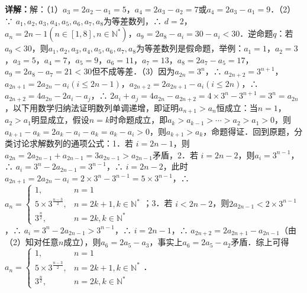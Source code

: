 \begin{question}[points=18]
\begin{solution}
\textbf{详解：}解：（1）$a_3=2a_2-a_1=5$，$a_4=2a_3-a_2=7$或$a_4=2a_3-a_1=9$．（2）∵ $a_1,a_2,a_3,a_4,a_5,a_6,a_7,a_8$为等差数列，∴ $d=2$，$a_n=2n-1(n\in[1,8],n\in\mathbb{N}^*)$，$a_9=2a_8-a_i=30-a_i<30$．逆命题$q$：若$a_9<30$，则$a_1,a_2,a_3,a_4,a_5,a_6,a_7,a_8$为等差数列是假命题，举例：$a_1=1$，$a_2=3$，$a_3=5$，$a_4=7$，$a_5=9$，$a_6=11$，$a_7=13$，$a_8=2a_7-a_5=17$，$a_9=2a_8-a_7=21<30$但不成等差．（3）因为$a_{2n}=3^n$，∴ $a_{2n+2}=3^{n+1}$，$a_{2n+1}=2a_{2n}-a_i(i\leq 2n-1)$，$a_{2n+2}=2a_{2n+1}-a_i(i\leq 2n)$，∴ $a_{2n+2}=4a_{2n}-2a_i-a_j$，∴ $2a_i+a_j=4a_{2n}-a_{2n+2}=4\times3^n-3^{n+1}=3^n=a_{2n}$，以下用数学归纳法证明数列单调递增，即证明$a_{n+1}>a_n$恒成立：当$n=1$，$a_2>a_1$明显成立，假设$n=k$时命题成立，即$a_k>a_{k-1}>\cdots>a_2>a_1>0$，则$a_{k+1}-a_k=2a_k-a_i-a_k=a_k-a_i>0$，则$a_{k+1}>a_k$，命题得证．回到原题，分类讨论求解数列的通项公式：1．若 $i=2n-1$，则$a_{2n}=2a_{2n-1}+a_{2n-1}=3a_{2n-1}>a_{2n-1}$矛盾，2．若 $i=2n-2$，则$a_i=3^{n-1}$，∴ $a_i=3^n-2a_{2n-1}=3^{n-1}$，∴ $i=2n-2$，此时$a_{2n+1}=2a_{2n}-a_i=2\times3^n-3^{n-1}=5\times3^{n-1}$，∴ $a_n=\begin{cases}1, & n=1\\5\times3^{\frac{n-3}{2}}, & n=2k+1,k\in\mathbb{N}^*\\3^{\frac{n}{2}}, & n=2k,k\in\mathbb{N}^*\end{cases}$；3．若 $i<2n-2$，则$2a_{2n-1}<2\times3^{n-1}$，∴ $a_i=3^n-2a_{2n-1}>3^{n-1}$，∴ $i=2n-1$，∴ $a_{2n+2}=2a_{2n+1}-a_{2n-1}$（由（2）知对任意$n$成立），则$a_6=2a_5-a_3$，事实上$a_6=2a_5-a_2$矛盾．综上可得$a_n=\begin{cases}1, & n=1\\5\times3^{\frac{n-3}{2}}, & n=2k+1,k\in\mathbb{N}^*\\3^{\frac{n}{2}}, & n=2k,k\in\mathbb{N}^*\end{cases}$．
\end{solution}
\end{question}


